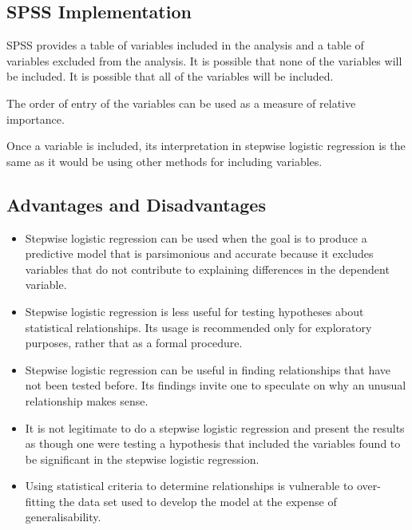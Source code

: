 \documentclass[a4paper,12pt]{article}
\begin{document}
\subsection*{SPSS Implementation}
SPSS provides a table of variables included in the analysis and a table of variables excluded from the analysis.  It is possible that none of the variables will be included.  It is possible that all of the variables will be included.

The order of entry of the variables can be used as a measure of relative importance.

Once a variable is included, its interpretation in stepwise logistic regression is the same as it would be using other methods for including variables.
\subsection*{Advantages and Disadvantages}
\begin{itemize}
	\item Stepwise logistic regression can be used when the goal is to produce a predictive model that is parsimonious and accurate because it excludes variables that do not contribute to explaining differences in the dependent variable.
	
	\item Stepwise logistic regression is less useful for testing hypotheses about statistical relationships. Its usage is recommended only for exploratory purposes, rather that as a formal procedure.
	
	\item Stepwise logistic regression can be useful in finding relationships that have not been tested before. Its findings invite one to speculate on why an unusual relationship makes sense.
	
	\item It is not legitimate to do a stepwise logistic regression and present the results as though one were testing a hypothesis that included the variables found to be significant in the stepwise logistic regression.
	
	\item Using statistical criteria to determine relationships is vulnerable to over-fitting the data set used to develop the model at the expense of generalisability.
	
\end{itemize}
\end{document}
